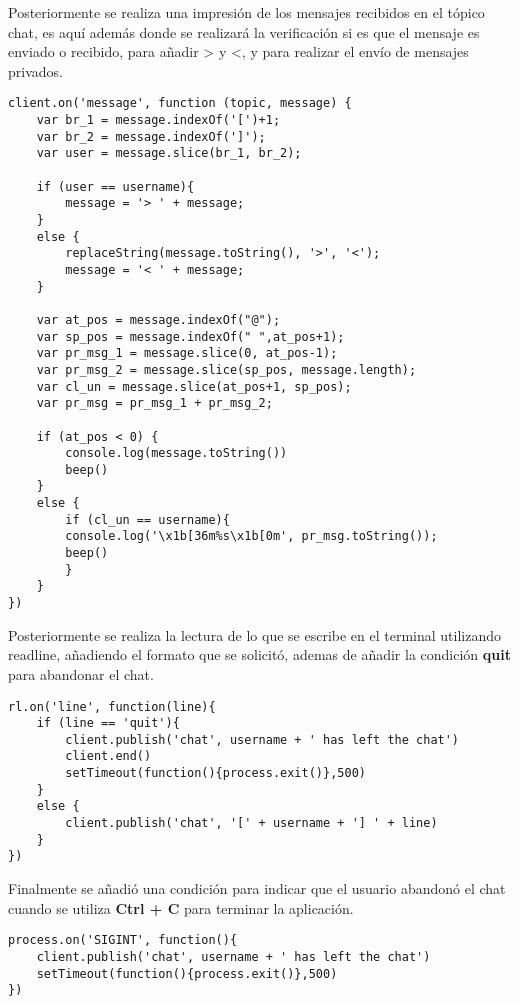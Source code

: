 \documentclass{article}
\begin{document}
\noindent Posteriormente se realiza una impresi\'on de los mensajes recibidos en el t\'opico chat, es aqu\'i adem\'as donde se realizar\'a la verificaci\'on si es que el mensaje es enviado o recibido, para añadir > y <, y para realizar el env\'io de mensajes privados.
\begin{verbatim}
client.on('message', function (topic, message) {
	var br_1 = message.indexOf('[')+1;
	var br_2 = message.indexOf(']');
	var user = message.slice(br_1, br_2);

	if (user == username){
		message = '> ' + message;
	}
	else {
		replaceString(message.toString(), '>', '<');
		message = '< ' + message;
	}

	var at_pos = message.indexOf("@");
	var sp_pos = message.indexOf(" ",at_pos+1);
	var pr_msg_1 = message.slice(0, at_pos-1);
	var pr_msg_2 = message.slice(sp_pos, message.length);
	var cl_un = message.slice(at_pos+1, sp_pos);
	var pr_msg = pr_msg_1 + pr_msg_2;
	
	if (at_pos < 0) {
		console.log(message.toString())
		beep()
	}
	else {
		if (cl_un == username){
		console.log('\x1b[36m%s\x1b[0m', pr_msg.toString());
		beep()
		}
	}
})
\end{verbatim}
\clearpage
\noindent Posteriormente se realiza la lectura de lo que se escribe en el terminal utilizando readline, añadiendo el formato que se solicit\'o, ademas de añadir la condici\'on {\selectfont\textbf{quit}} para abandonar el chat.
\begin{verbatim}
rl.on('line', function(line){
	if (line == 'quit'){
		client.publish('chat', username + ' has left the chat')
		client.end()
		setTimeout(function(){process.exit()},500)
	}
	else {
		client.publish('chat', '[' + username + '] ' + line)
	}
})
\end{verbatim}
\noindent Finalmente se añadi\'o una condici\'on para indicar que el usuario abandon\'o el chat cuando se utiliza {\selectfont\textbf{Ctrl + C}} para terminar la aplicaci\'on.
\begin{verbatim}
process.on('SIGINT', function(){
	client.publish('chat', username + ' has left the chat')
	setTimeout(function(){process.exit()},500)
})
\end{verbatim}
\clearpage
\end{document}
